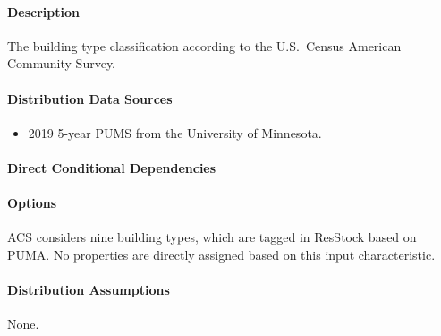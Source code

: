\paragraph{Description}
% 
The building type classification according to the U.S.~Census American Community Survey.

\paragraph{Distribution Data Sources}
% 
\begin{itemize}
    \item 2019 5-year PUMS from the University of Minnesota.
\end{itemize}

\paragraph{Direct Conditional Dependencies}


\paragraph{Options}
ACS considers nine building types, which are tagged in ResStock based on PUMA. No properties are directly assigned based on this input characteristic.



\paragraph{Distribution Assumptions}
% 
None.
